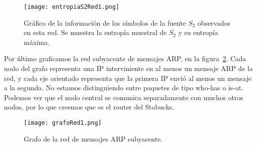 \begin{figure}[H]
\centering
\texttt{[image: entropiaS2Red1.png]}
\caption{Gráfico de la información de los símbolos de la fuente $S_2$ observados en esta red. Se muestra la entropía muestral de $S_2$ y su entropía máxima.}
\label{entropias2_1}
\end{figure}

Por último graficamos la red subyacente de mensajes ARP, en la figura~\ref{grafo1}. Cada nodo del grafo representa una IP interviniente en al menos un mensaje ARP de la red, y cada eje orientado representa que la primera IP envió al menos un mensaje a la segunda. No estamos distinguiendo entre paquetes de tipo who-has o is-at. Podemos ver que el nodo central se comunica separadamente con muchos otros nodos, por lo que creemos que es el router del Stabucks.

\begin{figure}[H]
\centering
\texttt{[image: grafoRed1.png]}
\caption{Grafo de la red de mensajes ARP subyacente.}
\label{grafo1}
\end{figure}
